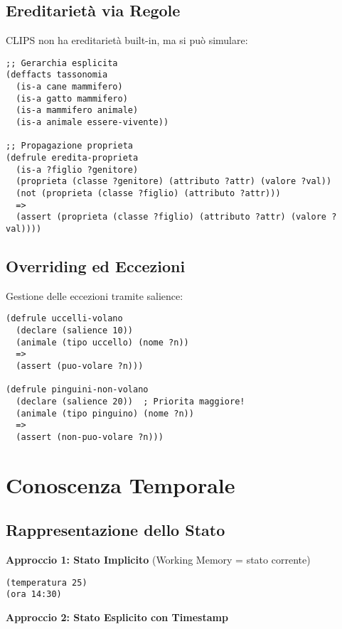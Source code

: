 \subsection{Ereditarietà via Regole}

CLIPS non ha ereditarietà built-in, ma si può simulare:

\begin{lstlisting}[language=CLIPS]
;; Gerarchia esplicita
(deffacts tassonomia
  (is-a cane mammifero)
  (is-a gatto mammifero)
  (is-a mammifero animale)
  (is-a animale essere-vivente))

;; Propagazione proprieta
(defrule eredita-proprieta
  (is-a ?figlio ?genitore)
  (proprieta (classe ?genitore) (attributo ?attr) (valore ?val))
  (not (proprieta (classe ?figlio) (attributo ?attr)))
  =>
  (assert (proprieta (classe ?figlio) (attributo ?attr) (valore ?val))))
\end{lstlisting}

\subsection{Overriding ed Eccezioni}

Gestione delle eccezioni tramite salience:

\begin{lstlisting}[language=CLIPS]
(defrule uccelli-volano
  (declare (salience 10))
  (animale (tipo uccello) (nome ?n))
  =>
  (assert (puo-volare ?n)))

(defrule pinguini-non-volano
  (declare (salience 20))  ; Priorita maggiore!
  (animale (tipo pinguino) (nome ?n))
  =>
  (assert (non-puo-volare ?n)))
\end{lstlisting}

\section{Conoscenza Temporale}

\subsection{Rappresentazione dello Stato}

\textbf{Approccio 1: Stato Implicito} (Working Memory = stato corrente)

\begin{lstlisting}[language=CLIPS]
(temperatura 25)
(ora 14:30)
\end{lstlisting}

\textbf{Approccio 2: Stato Esplicito con Timestamp}

